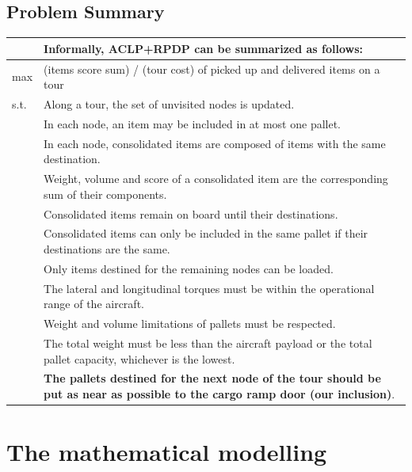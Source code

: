 \documentclass[preprint,authoryear]{elsarticle}
\begin{document}
\subsection{Problem Summary}


\bgroup
\def\arraystretch{1.2}
\begin{table}[H]
	\centering
	\small
	\begin{tabular}{MT}
		&Informally, ACLP+RPDP can be summarized as follows:\\
		\midrule
		max &  (items score sum) / (tour cost) of picked up and delivered items on a tour  \\
		\midrule
s.t.    & Along a tour, the set of unvisited nodes is updated. \\
		& In each node, an item may be included in at most one pallet.\\		
		& In each node, consolidated items are composed of items with the same destination. \\
		& Weight, volume and score of a consolidated item are the corresponding sum of their components.\\
		& Consolidated items remain on board until their destinations.\\	
		& Consolidated items can only be included in the same pallet if their destinations are the same.\\
		& Only items destined for the remaining nodes can be loaded.  \\
		& The lateral and longitudinal torques must be within the operational range of the aircraft.\\
		& Weight and volume limitations of pallets must be respected.\\
		& The total weight must be less than the aircraft payload or the total pallet capacity, whichever is the lowest.\\	
		& {\bf The pallets destined for the next node of the tour should be put as near as possible to the cargo ramp door (our inclusion)}.\\		
		\midrule
	\end{tabular}
	\normalsize
\end{table}
\egroup 


\section{The mathematical modelling}
\label{sec4}
\end{document}
